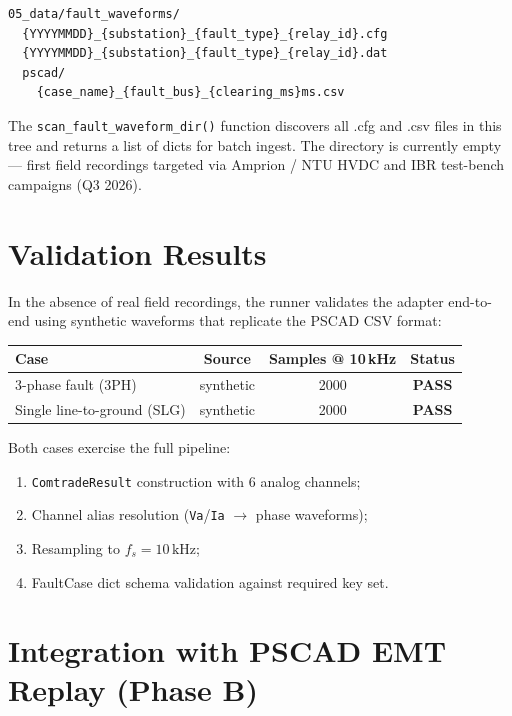 \documentclass[11pt,a4paper]{article}
\begin{document}
\begin{lstlisting}
05_data/fault_waveforms/
  {YYYYMMDD}_{substation}_{fault_type}_{relay_id}.cfg
  {YYYYMMDD}_{substation}_{fault_type}_{relay_id}.dat
  pscad/
    {case_name}_{fault_bus}_{clearing_ms}ms.csv
\end{lstlisting}

The \texttt{scan\_fault\_waveform\_dir()} function discovers all .cfg and
.csv files in this tree and returns a list of dicts for batch ingest.
The directory is currently empty — first field recordings targeted via
Amprion / NTU HVDC and IBR test-bench campaigns (Q3 2026).

\section{Validation Results}
\label{sec:results}

In the absence of real field recordings, the runner validates the adapter
end-to-end using synthetic waveforms that replicate the PSCAD CSV format:

\begin{center}
\begin{tabular}{lccc}
\toprule
Case & Source & Samples @ 10\,kHz & Status \\
\midrule
3-phase fault (3PH) & synthetic & 2000 & \textbf{PASS} \\
Single line-to-ground (SLG) & synthetic & 2000 & \textbf{PASS} \\
\bottomrule
\end{tabular}
\end{center}

Both cases exercise the full pipeline:
\begin{enumerate}
  \item \texttt{ComtradeResult} construction with 6 analog channels;
  \item Channel alias resolution (\texttt{Va}/\texttt{Ia} $\to$ phase waveforms);
  \item Resampling to $f_s = 10\,\text{kHz}$;
  \item FaultCase dict schema validation against required key set.
\end{enumerate}

\section{Integration with PSCAD EMT Replay (Phase B)}
\label{sec:pscad}
\end{document}
